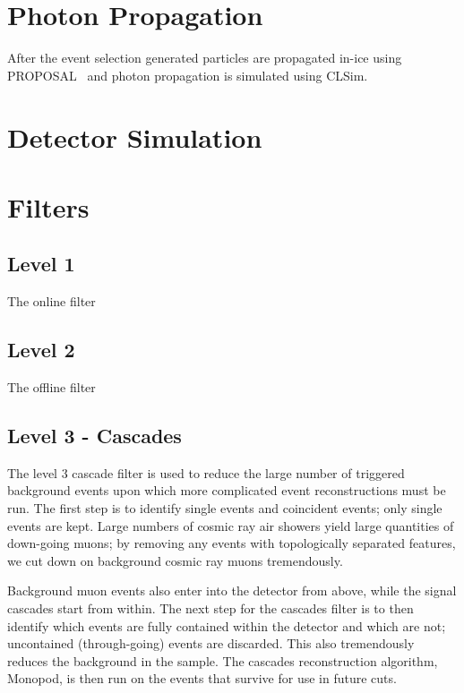 \documentclass[main.tex]{subfiles}
\begin{document}
\section{Photon Propagation}

After the event selection generated particles are propagated in-ice using PROPOSAL~\cite{Koehne:2013gpa} and photon propagation is simulated using CLSim. 

\section{Detector Simulation}

\section{Filters}

\subsection{Level 1}

The online filter

\subsection{Level 2}

The offline filter 

\subsection{Level 3 - Cascades}

The level 3 cascade filter is used to reduce the large number of triggered background events upon which more complicated event reconstructions must be run. 
The first step is to identify single events and coincident events; only single events are kept. 
Large numbers of cosmic ray air showers yield large quantities of down-going muons; by removing any events with topologically separated features, we cut down on background cosmic ray muons tremendously. 

Background muon events also enter into the detector from above, while the signal cascades start from within.
The next step for the cascades filter is to then identify which events are fully contained within the detector and which are not; uncontained (through-going) events are discarded. 
This also tremendously reduces the background in the sample. 
The cascades reconstruction algorithm, Monopod, is then run on the events that survive for use in future cuts. 
\end{document}
